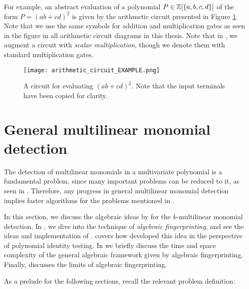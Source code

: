 For example, an abstract evaluation of a polynomial $P \in \mathbb Z[\{a,b,c,d\}]$ of the form 
$P = (ab+cd)^2$ is given by the arithmetic circuit presented in Figure \ref{fig:circuit_example}. 
Note that we use the same symbols for addition and multiplication gates as seen in the figure 
in all arithmetic circuit diagrams in this thesis. 
Note that in , we augment a circuit with \emph{scalar multiplication}, 
though we denote them with standard multiplication gates.

\begin{figure}[h]
  \texttt{[image: arithmetic\_circuit\_EXAMPLE.png]}
  \centering
  \caption{A circuit for evaluating $(ab+cd)^2$. 
  Note that the input terminals have been copied for clarity.}
  \label{fig:circuit_example}
\end{figure}

\section{General multilinear monomial detection}
\label{sect:general_mld}

The detection of multilinear monomials in a multivariate polynomial is a fundamental problem, 
since many important problems can be reduced to it, 
as seen in . 
Therefore, any progress in general multilinear monomial detection implies 
faster algorithms for the problems mentioned in .

In this section, 
we discuss the algebraic ideas by \citeauthor{KouWil09} \cite{Koutis08, Williams09, KouWil09} 
for the $k$-multilinear monomial detection. 
In , 
we dive into the technique of \emph{algebraic fingerprinting}, and 
see the ideas and implementation of \textcite{Koutis08}. 
 covers how 
\textcite{Williams09} developed this idea  
in the perspective of polynomial identity testing. 
In  we briefly discuss the time and space complexity 
of the general algebraic framework given by algebraic fingerprinting. 
Finally,  discusses the limits of algebraic fingerprinting.

As a prelude for the following sections, recall the relevant problem definition: 
\begin{problem}
\end{problem}

